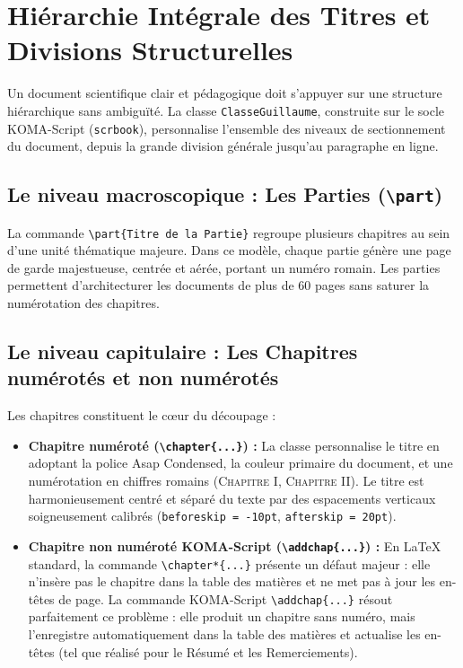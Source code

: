 \section{Hiérarchie Intégrale des Titres et Divisions Structurelles}
\label{sec:niveaux_sectionnement}

Un document scientifique clair et pédagogique doit s'appuyer sur une structure hiérarchique sans ambiguïté.
La classe \texttt{ClasseGuillaume}, construite sur le socle KOMA-Script (\texttt{scrbook}), personnalise l'ensemble des niveaux de sectionnement du document, depuis la grande division générale jusqu'au paragraphe en ligne.

\subsection{Le niveau macroscopique : Les Parties (\texttt{\textbackslash part})}
\label{subsec:parties}

La commande \texttt{\textbackslash part\{Titre de la Partie\}} regroupe plusieurs chapitres au sein d'une unité thématique majeure.
Dans ce modèle, chaque partie génère une page de garde majestueuse, centrée et aérée, portant un numéro romain.
Les parties permettent d'architecturer les documents de plus de 60 pages sans saturer la numérotation des chapitres.

\subsection{Le niveau capitulaire : Les Chapitres numérotés et non numérotés}
\label{subsec:chapitres}

Les chapitres constituent le cœur du découpage :
\begin{itemize}
  \item \textbf{Chapitre numéroté (\texttt{\textbackslash chapter\{...\}}) :}
  La classe personnalise le titre en adoptant la police {\AsapFont Asap Condensed}, la couleur primaire du document, et une numérotation en chiffres romains (\textsc{Chapitre I}, \textsc{Chapitre II}).
  Le titre est harmonieusement centré et séparé du texte par des espacements verticaux soigneusement calibrés (\texttt{beforeskip = -10pt}, \texttt{afterskip = 20pt}).
  \item \textbf{Chapitre non numéroté KOMA-Script (\texttt{\textbackslash addchap\{...\}}) :}
  En \LaTeX{} standard, la commande \texttt{\textbackslash chapter*\{...\}} présente un défaut majeur : elle n'insère pas le chapitre dans la table des matières et ne met pas à jour les en-têtes de page.
  La commande KOMA-Script \texttt{\textbackslash addchap\{...\}} résout parfaitement ce problème : elle produit un chapitre sans numéro, mais l'enregistre automatiquement dans la table des matières et actualise les en-têtes (tel que réalisé pour le Résumé et les Remerciements).
\end{itemize}

